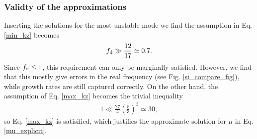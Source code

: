 \subsubsection{Validty of the approximations}\label{si_dust_rich_approx}
Inserting the solutions for the most unstable mode 
we find the assumption in Eq. \ref{min_kz} becomes  
\begin{align}
  f_\mathrm{d} \gg \frac{12}{17}\simeq 0.7.
\end{align}
Since $f_\mathrm{d} \leq 1$, this requirement can only be marginally
satisfied. However, we find that this mostly give errors in the real
frequency (see Fig. \ref{si_compare_fig}), while growth rates are
still captured correctly. 
On the other hand, the assumption of Eq. \ref{max_kz} becomes the trivial
inequality \begin{align} 
  1\ll \frac{27}{4}\left(\frac{5}{3}\right)^3\simeq 30,
\end{align}
so Eq. \ref{max_kz} is satisified, which justifies the approximate solution for 
$\mu$ in Eq. \ref{mu_explicit}.  









































































